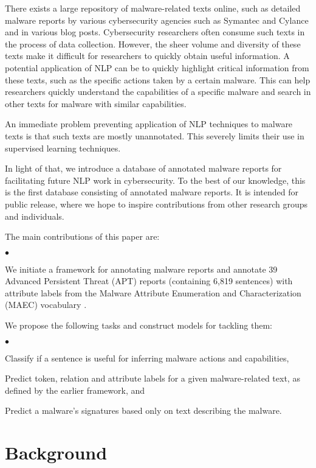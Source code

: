 \documentclass[11pt,a4paper]{article}
\newcommand{\squishlist}{
 \begin{list}{$\bullet$}
  { \setlength{\itemsep}{0pt}
     \setlength{\parsep}{3pt}
     \setlength{\topsep}{3pt}
     \setlength{\partopsep}{0pt}
     \setlength{\leftmargin}{1.5em}
     \setlength{\labelwidth}{1em}
     \setlength{\labelsep}{0.5em} } }
\newcommand{\squishlisttwo}{
 \begin{list}{$\bullet$}
  { \setlength{\itemsep}{0pt}
    \setlength{\parsep}{0pt}
    \setlength{\topsep}{0pt}
    \setlength{\partopsep}{0pt}
    \setlength{\leftmargin}{2em}
    \setlength{\labelwidth}{1.5em}
    \setlength{\labelsep}{0.5em} } }
\newcommand{\squishend}{
  \end{list}  }
\begin{document}
There exists a large repository of malware-related texts online, such as detailed malware reports by various cybersecurity agencies such as Symantec \cite{DiMaggio:15} and Cylance \cite{Gross:16} and in various blog posts. Cybersecurity researchers often consume such texts in the process of data collection. However, the sheer volume and diversity of these texts make it difficult for researchers to quickly obtain useful information. A potential application of NLP can be to quickly highlight critical information from these texts, such as the specific actions taken by a certain malware. This can help researchers quickly understand the capabilities of a specific malware and search in other texts for malware with similar capabilities. 

An immediate problem preventing application of NLP techniques to malware texts is that such texts are mostly unannotated. This severely limits their use in supervised learning techniques.

In light of that, we introduce a database of annotated malware reports for facilitating future NLP work in cybersecurity. To the best of our knowledge, this is the first database consisting of annotated malware reports. It is intended for public release, where we hope to inspire contributions from other research groups and individuals.

The main contributions of this paper are:
\squishlist %
\item We initiate a framework for annotating malware reports and annotate 39 Advanced Persistent Threat (APT) reports (containing 6,819 sentences) with attribute labels from the Malware Attribute Enumeration and Characterization (MAEC) vocabulary \cite{Kirillov:10}.
\item We propose the following tasks and construct models for tackling them:
	\squishlisttwo %
	\item Classify if a sentence is useful for inferring malware actions and capabilities,
	\item Predict token, relation and attribute labels for a given malware-related text, as defined by the earlier framework, and
	\item Predict a malware's signatures based only on text describing the malware.
	\squishend %
\squishend %

\section{Background}
\end{document}
